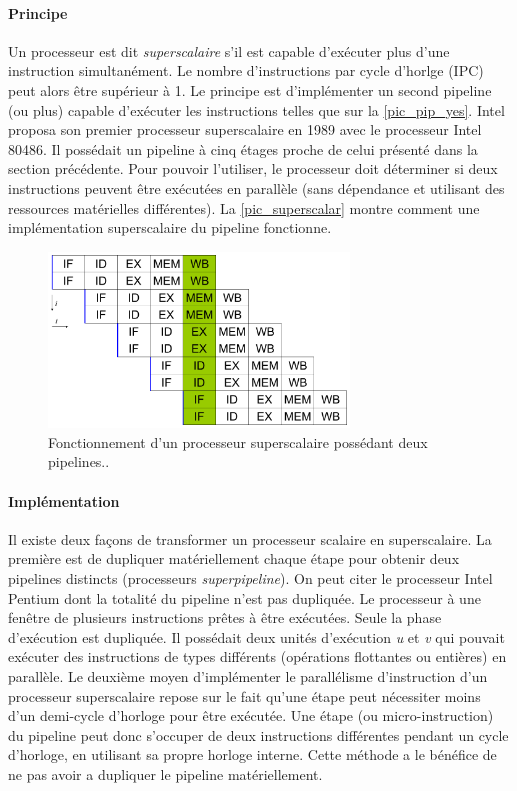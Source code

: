 \paragraph{Principe}
Un processeur est dit \textit{superscalaire} s'il est capable d'exécuter plus d'une instruction simultanément. Le nombre d'instructions par cycle d'horlge (IPC) peut alors être supérieur à 1. Le principe est d'implémenter un second pipeline (ou plus) capable d'exécuter les instructions telles que sur la \autoref{pic_pip_yes}. Intel proposa son premier processeur superscalaire en 1989 avec le processeur Intel 80486. Il possédait un pipeline à cinq étages proche de celui présenté dans la section précédente. 
Pour pouvoir l'utiliser, le processeur doit déterminer si deux instructions peuvent être exécutées en parallèle (sans dépendance et utilisant des ressources matérielles différentes). La \autoref{pic_superscalar} montre comment une implémentation superscalaire du pipeline fonctionne. 

\begin{figure}
    \center
    \includegraphics[width=8cm]{images/Chapitre1/superscalar.png}
    \caption[Processeur superscalaire]{Fonctionnement d'un processeur superscalaire possédant deux pipelines.\protect\footnotemark. \label{pic_superscalar} }
\end{figure}

\paragraph{Implémentation}
Il existe deux façons de transformer un processeur scalaire en superscalaire. La première est de dupliquer matériellement chaque étape pour obtenir deux pipelines distincts (processeurs \textit{superpipeline}). On peut citer le processeur Intel Pentium dont la totalité du pipeline n'est pas dupliquée. Le processeur à une fenêtre de plusieurs instructions prêtes à être exécutées. Seule la phase d'exécution est dupliquée.  Il possédait deux unités d'exécution \textit{u} et \textit{v} qui pouvait exécuter des instructions de types différents (opérations flottantes ou entières) en parallèle. 
Le deuxième moyen d'implémenter le parallélisme d'instruction d'un processeur superscalaire repose sur le fait qu'une étape peut nécessiter moins d'un demi-cycle d'horloge pour être exécutée. Une étape (ou micro-instruction) du pipeline peut donc s'occuper de deux instructions différentes pendant un cycle d'horloge, en utilisant sa propre horloge interne. Cette méthode a le bénéfice de ne pas avoir a dupliquer le pipeline matériellement. 

